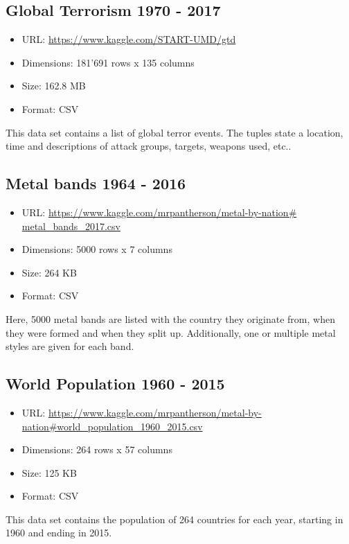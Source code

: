 \subsection{Global Terrorism 1970 - 2017}
\begin{itemize}
	\item URL: \url{https://www.kaggle.com/START-UMD/gtd}
	\item Dimensions: 181'691 rows x 135 columns
	\item Size: 162.8 MB
	\item Format: CSV
\end{itemize}

This data set contains a list of global terror events. The tuples state a location, time and descriptions of attack groups, targets, weapons used, etc.. 
	
\subsection{Metal bands 1964 - 2016}
\begin{itemize}
	\item URL: \url{https://www.kaggle.com/mrpantherson/metal-by-nation# metal_bands_2017.csv}
	\item Dimensions: 5000 rows x 7 columns
	\item Size: 264 KB
	\item Format: CSV
\end{itemize}

Here, 5000 metal bands are listed with the country they originate from, when they were formed and when they split up. Additionally, one or multiple metal styles are given for each band.

\subsection{World Population 1960 - 2015}
\begin{itemize}
	\item URL: \url{https://www.kaggle.com/mrpantherson/metal-by-nation#world_population_1960_2015.csv}
	\item Dimensions: 264 rows x 57 columns
	\item Size: 125 KB
	\item Format: CSV
\end{itemize}

This data set contains the population of 264 countries for each year, starting in 1960 and ending in 2015.

